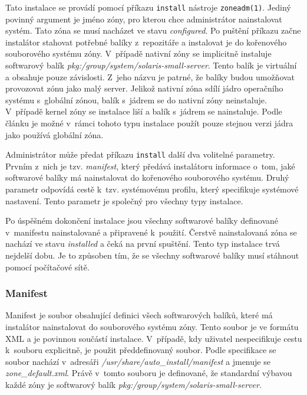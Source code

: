 Tato instalace se provádí pomocí příkazu \verb|install| nástroje \verb|zoneadm(1)|. Jediný povinný argument je jméno
zóny, pro kterou chce administrátor nainstalovat systém. Tato zóna se musí nacházet ve stavu \textit{configured}. Po puštění 
příkazu začne instalátor stahovat potřebné balíky z~repozitáře a instalovat je do kořenového souborového systému zóny. V~případě
nativní zóny se implicitně instaluje softwarový balík \textit{pkg:/group/system/solaris-small-server}. Tento balík je virtuální
a obsahuje pouze závislosti. Z~jeho názvu je patrné, že balíky budou umožňovat provozovat zónu jako malý server. Jelikož nativní
zóna sdílí jádro operačního systému s~globální zónou, balík s~jádrem se do nativní zóny neinstaluje. V~případě kernel zóny
se instalace liší a balík s~jádrem se nainstaluje. Podle článku \cite{oracle:solaris:zones:kernel_version} je možné
v~rámci tohoto typu instalace použít pouze stejnou verzi jádra jako používá globální zóna.

Administrátor může předat příkazu \verb|install| další dva volitelné parametry. Prvním z~nich je tzv. \textit{manifest}, který
předává instalátoru informace o~tom, jaké softwarové balíky má nainstalovat do kořenového souborového systému. Druhý parametr
odpovídá cestě k~tzv. systémovému profilu, který specifikuje systémové nastavení. Tento parametr je společný pro všechny typy
instalace.

Po úspěšném dokončení instalace jsou všechny softwarové balíky definované v~manifestu nainstalované a připravené k~použití.
Čerstvě nainstalovaná zóna se nachází ve stavu \textit{installed} a čeká na první spuštění. Tento typ instalace trvá nejdelší
dobu. Je to způsoben tím, že se všechny softwarové balíky musí stáhnout pomocí počítačové sítě.
\subsubsection{Manifest}
\label{chapter:zones:instalation:repozitory:manifest}
Manifest je soubor obsahující definici všech softwarových balíků, které má instalátor nainstalovat do souborového systému zóny. Tento
soubor je ve formátu XML a je povinnou součástí instalace.  V~případě, kdy uživatel nespecifikuje cestu k~souboru explicitně, je použit
předdefinovaný soubor. Podle specifikace \cite{oracle:solaris:zones:manifest} se soubor nachází v~adresáři \textit{/usr/share/auto\_install/manifest}
a jmenuje se \textit{zone\_default.xml}. Právě v~tomto souboru je definované, že standardní výbavou každé zóny je softwarový
balík \textit{pkg:/group/system/solaris-small-server}.

